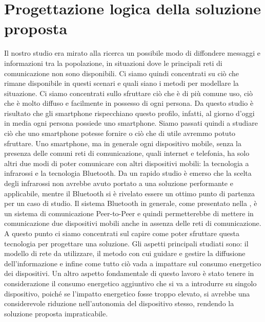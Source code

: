 \chapter{Progettazione logica della soluzione proposta}
\label{chap:Prog_log_sol}

Il nostro studio era mirato alla ricerca un possibile modo di diffondere messaggi e informazioni tra la popolazione, in situazioni dove le principali reti di comunicazione non sono disponibili. Ci siamo quindi concentrati su ciò che rimane disponibile in questi scenari e quali siano i metodi per modellare la situazione. Ci siamo concentrati sullo sfruttare ciò che è di più comune uso, ciò che è molto diffuso e facilmente in possesso di ogni persona. Da questo studio è risultato che gli smartphone rispecchiano questo profilo, infatti, al giorno d'oggi in media ogni persona possiede uno smartphone. Siamo passati quindi a studiare ciò che uno smartphone potesse fornire o ciò che di utile avremmo potuto sfruttare. Uno smartphone, ma in generale ogni dispositivo mobile, senza la presenza delle comuni reti di comunicazione, quali internet e telefonia, ha solo altri due modi di poter comunicare con altri dispositivi mobili: la tecnologia a infrarossi e la tecnologia Bluetooth. Da un rapido studio è emerso che la scelta degli infrarossi non avrebbe avuto portato a una soluzione performante e applicabile, mentre il Bluetooth si è rivelato essere un ottimo punto di partenza per un caso di studio. Il sistema Bluetooth in generale, come presentato nella , è un sistema di comunicazione Peer-to-Peer e quindi permetterebbe di mettere in comunicazione due dispositivi mobili anche in assenza delle reti di comunicazione. A questo punto ci siamo concentrati sul capire come poter sfruttare questa tecnologia per progettare una soluzione. Gli aspetti principali studiati sono: il modello di rete da utilizzare, il metodo con cui guidare e gestire la diffusione dell'informazione e infine come tutto ciò vada a impattare sul consumo energetico dei dispositivi. Un altro aspetto fondamentale di questo lavoro è stato tenere in considerazione il consumo energetico aggiuntivo che si va a introdurre su singolo dispositivo, poiché se l'impatto energetico fosse troppo elevato, si avrebbe una considerevole riduzione nell'autonomia del dispositivo stesso, rendendo la soluzione proposta impraticabile.

